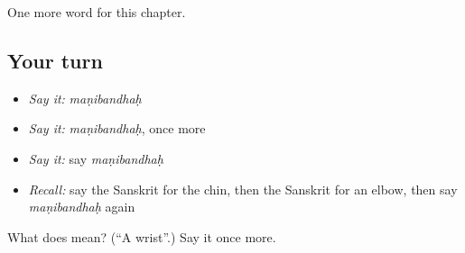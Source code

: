 \begin{grammarlens}[title={What you've built}]
One more word for this chapter.
\end{grammarlens}

\subsection*{Your turn}
\begin{itemize}
\raggedright
  \item \emph{Say it:} \emph{maṇibandhaḥ}
  \item \emph{Say it:} \emph{maṇibandhaḥ}, once more
  \item \emph{Say it:} say \emph{maṇibandhaḥ}
  \item \emph{Recall:} say the Sanskrit for the chin, then the Sanskrit for an elbow, then say \emph{maṇibandhaḥ} again
\end{itemize}

\begin{tcolorbox}[breakable,colback=teal!4,colframe=teal!35!black,title={Before you move on}]
What does  mean? (\textquotedblleft{}A wrist\textquotedblright{}.) Say it once more.
\end{tcolorbox}
